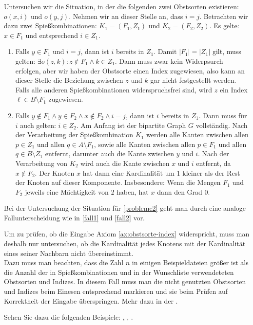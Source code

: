 Untersuchen wir die Situation, in der die folgenden 
zwei Obstsorten existieren: $o(x, i)$ und $o(y, j)$.
Nehmen wir an dieser Stelle an, dass $i=j$.
Betrachten wir dazu zwei Spießkombinationen: $K_1 = (F_1, Z_1)$ und $K_2 = (F_2, Z_2)$.
Es gelte: $x \in F_1$ und entsprechend $i \in Z_1$.
\begin{enumerate}[label={\upshape(F\arabic*)}]
  \item Falls $y \in F_1$ und $i = j$, dann ist $i$ bereits in $Z_1$. Damit $|F_1| = |Z_1|$ gilt,
  muss gelten: $\exists o(z, k) : z \notin F_1 \land k \in Z_1$.
  Dann muss zwar kein Widerpsurch erfolgen, aber wir haben der Obstsorte einen Index zugewiesen,
  also kann an dieser Stelle die Beziehung zwischen $z$ und $k$ gar nicht festgestellt werden.
  Falls alle anderen Spießkombinationen widerspruchsfrei sind,
  wird $z$ ein Index $\ell \in B \setminus F_1$ zugewiesen.\label{fall1}

  \item Falls $y \notin F_1 \land y \in F_2 \land x \notin F_2 \land i =j$, dann ist $i$ bereits in $Z_1$.
  Dann muss für $i$ auch gelten: $i \in Z_2$. Am Anfang ist der bipartite Graph $G$ vollständig.
  Nach der Verarbeitung der Spießkombination $K_1$ werden alle Kanten zwischen allen
  $p \in Z_1$ und allen $q \in A \setminus F_1$, sowie alle Kanten zwischen allen
  $p \in F_1$ und allen $q \in B \setminus Z_1$ entfernt, darunter auch die Kante zwischen
  $y$ und $i$. Nach der Verarbeitung von $K_2$ wird auch die Kante zwischen $x$ und $i$
  entfernt, da $x \notin F_2$. Der Knoten $x$ hat dann eine Kardinalität um 1 kleiner
  als der Rest der Knoten auf dieser Komponente. Insbesondere: Wenn die Mengen
  $F_1$ und $F_2$ jeweils eine Mächtigkeit von 2 haben, hat $x$ dann den Grad 0.\label{fall2}
\end{enumerate}

Bei der Untersuchung der Situation für \ref{probleme2} geht man durch eine analoge Fallunterscheidung wie
in \ref{fall1} und \ref{fall2} vor.

Um zu prüfen, ob die Eingabe Axiom \ref{ax:obstsorte-index} widerspricht, muss man deshalb
nur untersuchen, ob die Kardinalität jedes Knotens mit der Kardinalität eines seiner 
Nachbarn nicht übereinstimmt.\\
Dazu muss man beachten, dass die Zahl $n$ in einigen Beispieldateien größer ist
als die Anzahl der in Spießkombinationen und in der Wunschliste verwendeteten Obstsorten
und Indizes. In diesem Fall muss man die nicht genutzten Obstsorten und Indizes beim Einesen
entsprechend markieren und sie beim Prüfen auf Korrektheit der Eingabe überspringen. Mehr dazu
in der .

Sehen Sie dazu die folgenden Beispiele: , , .

